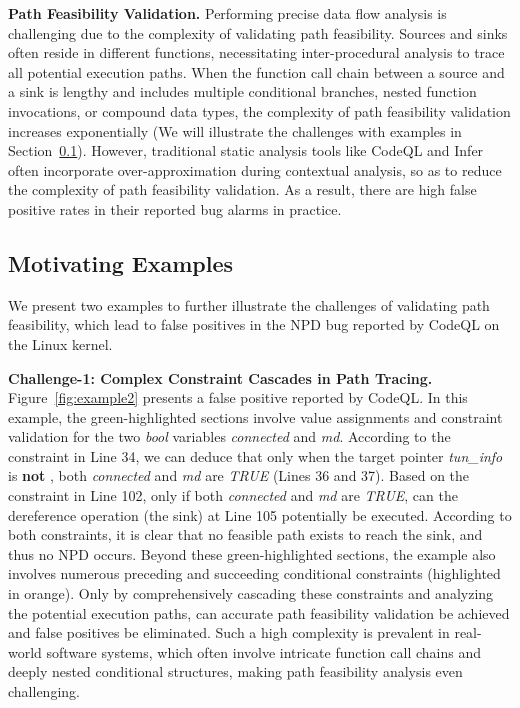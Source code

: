 \textbf{Path Feasibility Validation.}
Performing precise data flow analysis is challenging due to the complexity of validating path feasibility. Sources and sinks often reside in different functions, necessitating inter-procedural analysis to trace all potential execution paths. When the function call chain between a source and a sink is lengthy and includes multiple conditional branches, nested function invocations, or compound data types, the complexity of path feasibility validation
increases exponentially (We will illustrate the challenges with examples in Section~\ref{sec:example}).  
However, traditional static analysis tools like CodeQL and Infer often incorporate over-approximation during contextual analysis, so as to reduce the complexity of path feasibility validation. As a result, there are high false positive rates in their reported bug alarms in practice.     






\subsection{Motivating Examples}
\label{sec:example}
We present two examples to further illustrate the challenges of validating path feasibility, which lead to false positives in the NPD bug reported by CodeQL on the Linux kernel. 

\textbf{Challenge-1: Complex Constraint Cascades in Path Tracing.} 
Figure~\ref{fig:example2} presents a false positive reported by CodeQL. In this example,  the green-highlighted sections involve value assignments and constraint validation for the two \textit{bool} variables \textit{connected} and \textit{md}. According to the constraint in Line 34, we can deduce that only when the target pointer \textit{tun\_info} is \textbf{not} \NULL, both \textit{connected} and \textit{md} are \textit{TRUE} (Lines 36 and 37). Based on the constraint in Line 102, only if both \textit{connected} and \textit{md} are \textit{TRUE}, can the dereference operation (the sink) at Line 105 potentially be executed. According to both constraints, it is clear that no feasible path exists to reach the sink, and thus no NPD occurs. Beyond these green-highlighted sections, the example also involves numerous preceding and succeeding conditional constraints (highlighted in orange). Only by comprehensively cascading these constraints and analyzing the potential execution paths,  can accurate path feasibility validation be achieved and false positives be eliminated. Such a high complexity is prevalent in real-world software systems, which often involve intricate function call chains and deeply nested conditional structures, making path feasibility analysis even  challenging.


